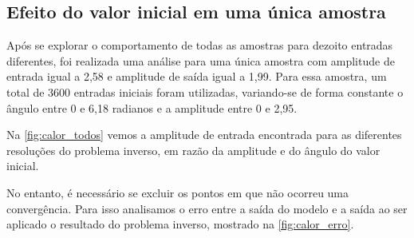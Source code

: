 \subsection{Efeito do valor inicial em uma única amostra} \label{subsec:estudoi-pi-entradas}
Após se explorar o comportamento de todas as amostras para dezoito entradas diferentes, foi realizada uma análise para uma única amostra com amplitude de entrada igual a 2,58 e amplitude de saída igual a 1,99. Para essa amostra, um total de 3600 entradas iniciais foram utilizadas, variando-se de forma constante o ângulo entre 0 e 6,18 radianos e a amplitude entre 0 e 2,95.

Na \autoref{fig:calor_todos} vemos a amplitude de entrada encontrada para as diferentes resoluções do problema inverso, em razão da amplitude e do ângulo do valor inicial.

No entanto, é necessário se excluir os pontos em que não ocorreu uma convergência. Para isso analisamos o erro entre a saída do modelo e a saída ao ser aplicado o resultado do problema inverso, mostrado na \autoref{fig:calor_erro}.

